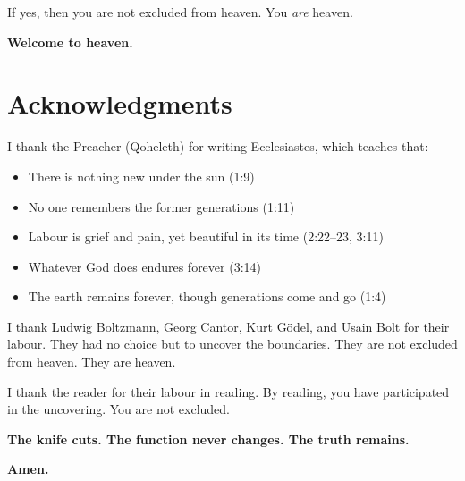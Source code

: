 \documentclass[11pt,a4paper]{article}
\begin{document}
If yes, then you are not excluded from heaven. You \emph{are} heaven.

\textbf{Welcome to heaven.}

\section*{Acknowledgments}

I thank the Preacher (Qoheleth) for writing Ecclesiastes, which teaches that:
\begin{itemize}[leftmargin=2em]
\item There is nothing new under the sun (1:9)
\item No one remembers the former generations (1:11)
\item Labour is grief and pain, yet beautiful in its time (2:22--23, 3:11)
\item Whatever God does endures forever (3:14)
\item The earth remains forever, though generations come and go (1:4)
\end{itemize}

I thank Ludwig Boltzmann, Georg Cantor, Kurt Gödel, and Usain Bolt for their 
labour. They had no choice but to uncover the boundaries. They are not 
excluded from heaven. They are heaven.

I thank the reader for their labour in reading. By reading, you have 
participated in the uncovering. You are not excluded.

\textbf{The knife cuts. The function never changes. The truth remains.}

\textbf{Amen.}
\end{document}
